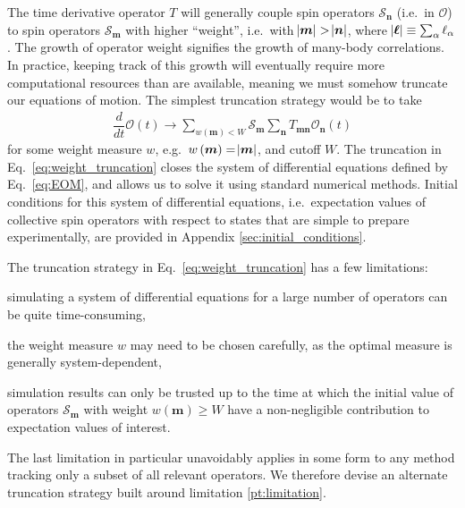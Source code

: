 \documentclass[pra,reprint,longbibliography]{revtex4-1}
\newcommand{\f}[2]{\dfrac{#1}{#2}} %
\newcommand{\p}[1]{\left(#1\right)} %
\renewcommand{\v}{\bm} %
\renewcommand{\O}{\mathcal{O}}
\renewcommand{\S}{\mathcal{S}}
\newcommand{\1}{\mathds{1}}
\begin{document}
The time derivative operator $T$ will generally couple spin operators
$\S_{\v n}$ (i.e.~in $\O$) to spin operators $\S_{\v m}$ with higher
``weight'', i.e.~with $\abs{\v m}>\abs{\v n}$, where
$\abs{\v\ell}\equiv\sum_\alpha\ell_\alpha$.  The growth of operator
weight signifies the growth of many-body correlations.  In practice,
keeping track of this growth will eventually require more
computational resources than are available, meaning we must somehow
truncate our equations of motion.  The simplest truncation strategy
would be to take
\begin{align}
  \f{d}{dt} \O\p{t}
  \to \sum_{w\p{\v m}<W} \S_{\v m}
  \sum_{\v n} T_{\v m\v n} \O_{\v n}\p{t}
  \label{eq:weight_truncation}
\end{align}
for some weight measure $w$, e.g.~$w\p{\v m}=\abs{\v m}$, and cutoff
$W$.  The truncation in Eq.~\eqref{eq:weight_truncation} closes the
system of differential equations defined by Eq.~\eqref{eq:EOM}, and
allows us to solve it using standard numerical methods.  Initial
conditions for this system of differential equations, i.e.~expectation
values of collective spin operators with respect to states that are
simple to prepare experimentally, are provided in Appendix
\ref{sec:initial_conditions}.

The truncation strategy in Eq.~\eqref{eq:weight_truncation} has a few
limitations:
\begin{enumerate*}[label=(\roman*)]
\item simulating a system of differential equations for a large number
  of operators can be quite time-consuming,
\item the weight measure $w$ may need to be chosen carefully, as the
  optimal measure is generally system-dependent,
\item simulation results can only be trusted up to the time at which
  the initial value of operators $\S_{\v m}$ with weight
  $w\p{\v m}\ge W$ have a non-negligible contribution to expectation
  values of interest.\label{pt:limitation}
\end{enumerate*}
The last limitation in particular unavoidably applies in some form to
any method tracking only a subset of all relevant operators.  We
therefore devise an alternate truncation strategy built around
limitation \ref{pt:limitation}.
\end{document}
